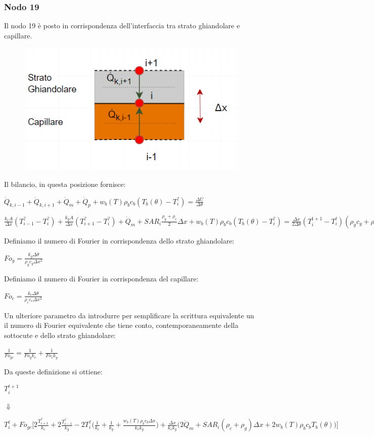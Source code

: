\subsubsection*{Nodo 19}
Il nodo 19 è posto in corrispondenza dell'interfaccia tra strato ghiandolare e capillare.
\begin{figure}[H]
    \centering
    \includegraphics[width=.6\textwidth]{Immagini/Nodi/nodo19.png} 
    \label{nodo19}
\end{figure}
\noindent
Il bilancio, in questa posizione fornisce:
\begin{center}
	$ \Dot{Q} _{k, i-1} +\Dot{Q} _{k, i+1}+ \Dot{Q} _{m} +\Dot{Q} _{p}+ w_b (T) \rho _b c_b (T_b(\theta)-T_i ^?)= \frac{\Delta U}{\Delta \theta} $
\end{center}
\vspace{0.15cm}
\begin{center}
	$ \frac{k_{c} A }{\Delta x}(T_{i-1} ^? - T_i ^? ) + \frac{k_g A }{\Delta x}(T_{i+1} ^? - T_i ^? )+ \Dot{Q} _{m} + SAR_i \frac{\rho _{g} + \rho _c}{2} \Delta x + w_b (T) \rho _b c_b (T_b(\theta)-T_i ^?) = \frac{\Delta x}{ 2 \Delta \theta}(T_i ^{t+1} - T_i ^t ) (\rho _{g} c_{g} + \rho _{c} c_{c} )$
\end{center}
Definiamo il numero di Fourier in corrispondenza dello strato ghiandolare:
\begin{center}
	$Fo_{g}= \frac{k_{g} \Delta \theta}{\rho _{g} c_{g} \Delta x^2}$
\end{center}
Definiamo il numero di Fourier in corrispondenza del capillare:
\begin{center}
	$Fo_{c}= \frac{k_{c} \Delta \theta}{\rho _{c} c_{c} \Delta x^2}$
\end{center}
Un ulteriore parametro da introdurre per semplificare la scrittura equivalente un il numero di Fourier equivalente che tiene conto, contemporaneamente della sottocute e dello strato ghiandolare:
\begin{center}
	$\frac{1}{Fo_{gc}}= \frac{1}{Fo_{g}k_c}+ \frac{1}{Fo_{c}k_{g}}$
\end{center}
Da queste definizione si ottiene:
\begin{center}
	$T_i ^{t+1} $
\end{center}
\begin{center}
	$\Downarrow$
\end{center}
\begin{center}
	$T_i ^t + Fo_{gc} \Bigg[ 2\frac{T_{i+1} ^?}{k_c} + 2\frac{T_{i-1} ^?}{k_{g}}- 2T_i ^? \Big(\frac{1}{k_c} + \frac{1}{k_{g}}+ \frac{ w_b (T) \rho _b c_b \Delta x }{k_{c}k_g} \Big) +  \frac{\Delta x }{k_{c}k_g} \Big(2\Dot{Q} _{m} +  SAR_i (\rho _{c}+ \rho _g) \Delta x + 2w_b (T) \rho _b c_b T_b(\theta)\Big) \Bigg]$
\end{center}


